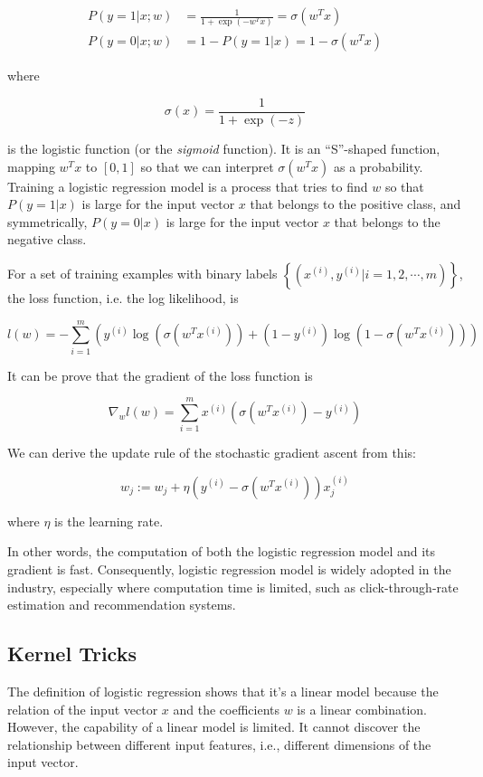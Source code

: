     \begin{align*}
        P(y=1 | x;w) &= \frac{1}{1+\exp(-w^Tx)} = \sigma(w^Tx)\\
        P(y=0 | x;w) &= 1-P(y=1 | x) = 1-\sigma(w^Tx)
    \end{align*}

    where

    \[
    \sigma(x) = \frac{1}{1+\exp(-z)}
    \]

    is the logistic function (or the \emph{sigmoid} function).
    It is an ``S''-shaped function, mapping $w^Tx$ to $[0,1]$
    so that we can interpret $\sigma(w^Tx)$ as a probability.
    Training a logistic regression model is a process that tries to find $w$ so that
    $P(y=1 | x)$ is large for the input vector $x$ that belongs to the positive class,
    and symmetrically, $P(y=0 | x)$ is large for the input vector $x$ that belongs to the negative class.

    For a set of training examples with binary labels $\left\{ (x^{(i)}, y^{(i)} | i = 1, 2, \cdots, m) \right\}$,
    the loss function, i.e. the log likelihood, is

    \[
    l(w) = -\sum_{i=1}^m \left( y^{(i)}\log\left(\sigma(w^Tx^{(i)})\right) + (1-y^{(i)})\log\left(1-\sigma(w^Tx^{(i)})\right) \right)
    \]

    It can be prove \cite{Ng2000} that the gradient of the loss function is

    \[
    \nabla_w l(w) = \sum_{i=1}^m x^{(i)}\left(\sigma(w^Tx^{(i)}) - y^{(i)}\right)
    \]

    We can derive the update rule of the stochastic gradient ascent from this:

    \[
    w_j := w_j + \eta \left( y^{(i)} - \sigma(w^Tx^{(i)}) \right) x_j^{(i)}
    \]

    where $\eta$ is the learning rate.

    In other words, the computation of both the logistic regression model and its gradient is fast.
    Consequently, logistic regression model is widely adopted in the industry,
    especially where computation time is limited, such as click-through-rate estimation \cite{DBLP:journals/corr/WangZY16}
    and recommendation systems.

    \subsection{Kernel Tricks}

        The definition of logistic regression shows that it's a linear model
        because the relation of the input vector $x$ and the coefficients $w$ is a linear combination.
        However, the capability of a linear model is limited.
        It cannot discover the relationship between different input features,
        i.e., different dimensions of the input vector.

